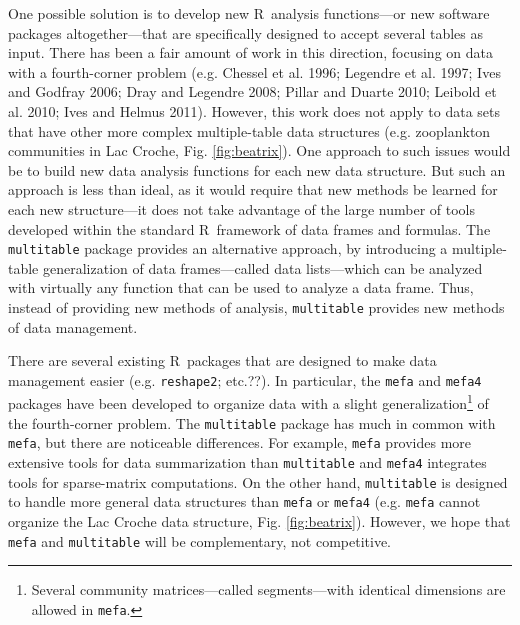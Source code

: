 \documentclass{article}
\newcommand{\R}{{\sf R}}
\newcommand{\code}[1]{\texttt{#1}}
\numberwithin{exercise}{section}
\begin{document}
One possible solution is to develop new \R\ analysis functions---or new software packages altogether---that are specifically designed to accept several tables as input.  There has been a fair amount of work in this direction, focusing on data with a fourth-corner problem (e.g. Chessel et al. 1996; Legendre et al. 1997; Ives and Godfray 2006; Dray and Legendre 2008; Pillar and Duarte 2010; Leibold et al. 2010; Ives and Helmus 2011).  However, this work does not apply to data sets that have other more complex multiple-table data structures (e.g. zooplankton communities in Lac Croche, Fig. \ref{fig:beatrix}).  One approach to such issues would be to build new data analysis functions for each new data structure.  But such an approach is less than ideal, as it would require that new methods be learned for each new structure---it does not take advantage of the large number of tools developed within the standard \R\ framework of data frames and formulas.  The \code{multitable} package provides an alternative approach, by introducing a multiple-table generalization of data frames---called data lists---which can be analyzed with virtually any function that can be used to analyze a data frame.  Thus, instead of providing new methods of analysis, \code{multitable} provides new methods of data management.

There are several existing \R\ packages that are designed to make data management easier (e.g. \code{reshape2}; etc.??).  In particular, the \code{mefa} and \code{mefa4} packages have been developed to organize data with a slight generalization\footnote{Several community matrices---called segments---with identical dimensions are allowed in \code{mefa}.} of the fourth-corner problem.  The \code{multitable} package has much in common with \code{mefa}, but there are noticeable differences.  For example, \code{mefa} provides more extensive tools for data summarization than \code{multitable} and \code{mefa4} integrates tools for sparse-matrix computations.  On the other hand, \code{multitable} is designed to handle more general data structures than \code{mefa} or \code{mefa4} (e.g. \code{mefa} cannot organize the Lac Croche data structure, Fig. \ref{fig:beatrix}).  However, we hope that \code{mefa} and \code{multitable} will be complementary, not competitive.
\end{document}

